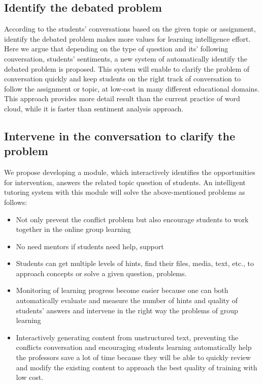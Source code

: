 \documentclass[letterpaper%
, twoside%
, 12pt%
,these%
, english%
,creativecommons,hyperref, withAlgo2e %
]{thETS}
\begin{document}
\subsection{Identify the debated problem}

According to the students' conversations based on the given topic or assignment, identify the debated problem makes more values for learning intelligence effort. Here we argue that depending on the type of question and its’ following conversation, students' sentiments, a new system of automatically identify the debated problem is proposed. This system will enable to clarify the problem of conversation quickly and keep students on the right track of conversation to follow the assignment or topic, at low-cost in many different educational domains. This approach provides more
detail result than the current practice of word cloud, while it is
faster than sentiment analysis approach.


\subsection{Intervene in the conversation to clarify the problem}
We propose developing a module, which interactively identifies the opportunities for intervention, answers the related topic question of students. An intelligent tutoring system with this module will solve the above-mentioned problems as follows:
\begin{itemize}
	\item Not only prevent the conflict problem but also encourage students to work together in the online group learning
	\item No need mentors if students need help, support
	\item Students can get multiple levels of hints, find their files, media, text, etc., to approach concepts or solve a given question, problems.
	\item     Monitoring of learning progress become easier because one can both automatically evaluate and measure the number of hints and quality of students’ answers and intervene in the right way the problems of group learning 
	\item     Interactively generating content from unstructured text, preventing the conflicts conversation and encouraging students learning automatically help the professors save a lot of time because they will be able to quickly review and modify the existing content to approach the best quality of training with low cost.
\end{itemize}
\end{document}
